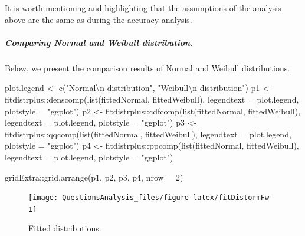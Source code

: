 \documentclass[
]{article}
\newenvironment{Shaded}{\begin{snugshade}}{\end{snugshade}}
\newcommand{\AttributeTok}[1]{\textcolor[rgb]{0.77,0.63,0.00}{#1}}
\newcommand{\DecValTok}[1]{\textcolor[rgb]{0.00,0.00,0.81}{#1}}
\newcommand{\FunctionTok}[1]{\textcolor[rgb]{0.00,0.00,0.00}{#1}}
\newcommand{\NormalTok}[1]{#1}
\newcommand{\OtherTok}[1]{\textcolor[rgb]{0.56,0.35,0.01}{#1}}
\newcommand{\SpecialCharTok}[1]{\textcolor[rgb]{0.00,0.00,0.00}{#1}}
\newcommand{\StringTok}[1]{\textcolor[rgb]{0.31,0.60,0.02}{#1}}
\begin{document}
It is worth mentioning and highlighting that the assumptions of the analysis above are the same as during the accuracy analysis.

\hypertarget{comparing-normal-and-weibull-distribution.-1}{%
\subparagraph{Comparing Normal and Weibull distribution.}\label{comparing-normal-and-weibull-distribution.-1}}

Below, we present the comparison results of Normal and Weibull distributions.

\begin{Shaded}
\begin{Highlighting}[]
\NormalTok{plot.legend }\OtherTok{\textless{}{-}} \FunctionTok{c}\NormalTok{(}\StringTok{"Normal}\SpecialCharTok{\textbackslash{}n}\StringTok{ distribution"}\NormalTok{, }\StringTok{"Weibull}\SpecialCharTok{\textbackslash{}n}\StringTok{ distribution"}\NormalTok{)}
\NormalTok{p1 }\OtherTok{\textless{}{-}}\NormalTok{ fitdistrplus}\SpecialCharTok{::}\FunctionTok{denscomp}\NormalTok{(}\FunctionTok{list}\NormalTok{(fittedNormal, fittedWeibull), }\AttributeTok{legendtext =}\NormalTok{ plot.legend, }\AttributeTok{plotstyle =} \StringTok{"ggplot"}\NormalTok{)}
\NormalTok{p2 }\OtherTok{\textless{}{-}}\NormalTok{ fitdistrplus}\SpecialCharTok{::}\FunctionTok{cdfcomp}\NormalTok{(}\FunctionTok{list}\NormalTok{(fittedNormal, fittedWeibull), }\AttributeTok{legendtext =}\NormalTok{ plot.legend, }\AttributeTok{plotstyle =} \StringTok{"ggplot"}\NormalTok{)}
\NormalTok{p3 }\OtherTok{\textless{}{-}}\NormalTok{ fitdistrplus}\SpecialCharTok{::}\FunctionTok{qqcomp}\NormalTok{(}\FunctionTok{list}\NormalTok{(fittedNormal, fittedWeibull), }\AttributeTok{legendtext =}\NormalTok{ plot.legend, }\AttributeTok{plotstyle =} \StringTok{"ggplot"}\NormalTok{)}
\NormalTok{p4 }\OtherTok{\textless{}{-}}\NormalTok{ fitdistrplus}\SpecialCharTok{::}\FunctionTok{ppcomp}\NormalTok{(}\FunctionTok{list}\NormalTok{(fittedNormal, fittedWeibull), }\AttributeTok{legendtext =}\NormalTok{ plot.legend, }\AttributeTok{plotstyle =} \StringTok{"ggplot"}\NormalTok{)}

\NormalTok{gridExtra}\SpecialCharTok{::}\FunctionTok{grid.arrange}\NormalTok{(p1, p2, p3, p4, }\AttributeTok{nrow =} \DecValTok{2}\NormalTok{)}
\end{Highlighting}
\end{Shaded}

\begin{figure}

{\centering \texttt{[image: QuestionsAnalysis\_files/figure-latex/fitDistormFw-1]} 

}

\caption{Fitted distributions.}\label{fig:fitDistormFw}
\end{figure}
\end{document}
